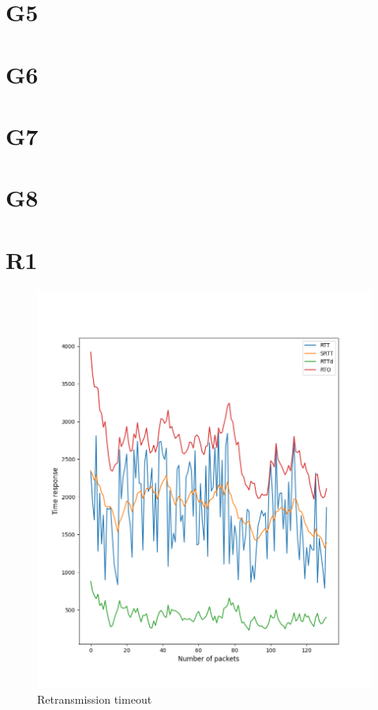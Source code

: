 \documentclass[hidelinks, 12pt, a4paper]{article}
\begin{document}
\section{G5}

\section{G6}

\section{G7}

\section{G8}

\section{R1}

\begin{figure}[h!]
\centering
	\includegraphics[height=.4\textheight, width=\textwidth]{assets/session1/r1.png}
	\caption{Retransmission timeout} 
\end{figure}
\end{document}
